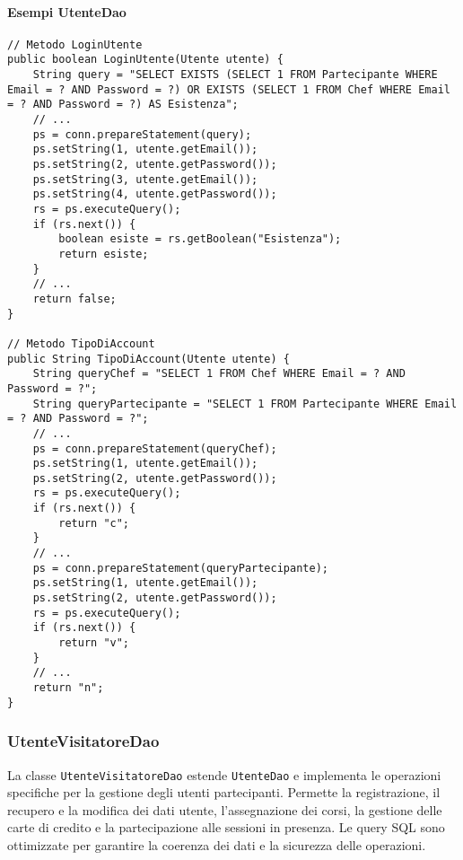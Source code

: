 \paragraph{Esempi UtenteDao}
\begin{verbatim}
// Metodo LoginUtente
public boolean LoginUtente(Utente utente) {
    String query = "SELECT EXISTS (SELECT 1 FROM Partecipante WHERE Email = ? AND Password = ?) OR EXISTS (SELECT 1 FROM Chef WHERE Email = ? AND Password = ?) AS Esistenza";
    // ...
    ps = conn.prepareStatement(query);
    ps.setString(1, utente.getEmail());
    ps.setString(2, utente.getPassword());
    ps.setString(3, utente.getEmail());
    ps.setString(4, utente.getPassword());
    rs = ps.executeQuery();
    if (rs.next()) {
        boolean esiste = rs.getBoolean("Esistenza");
        return esiste;
    }
    // ...
    return false;
}

// Metodo TipoDiAccount
public String TipoDiAccount(Utente utente) {
    String queryChef = "SELECT 1 FROM Chef WHERE Email = ? AND Password = ?";
    String queryPartecipante = "SELECT 1 FROM Partecipante WHERE Email = ? AND Password = ?";
    // ...
    ps = conn.prepareStatement(queryChef);
    ps.setString(1, utente.getEmail());
    ps.setString(2, utente.getPassword());
    rs = ps.executeQuery();
    if (rs.next()) {
        return "c";
    }
    // ...
    ps = conn.prepareStatement(queryPartecipante);
    ps.setString(1, utente.getEmail());
    ps.setString(2, utente.getPassword());
    rs = ps.executeQuery();
    if (rs.next()) {
        return "v";
    }
    // ...
    return "n";
}
\end{verbatim}

\subsubsection{UtenteVisitatoreDao}
La classe \texttt{UtenteVisitatoreDao} estende \texttt{UtenteDao} e implementa le operazioni specifiche per la gestione degli utenti partecipanti. Permette la registrazione, il recupero e la modifica dei dati utente, l'assegnazione dei corsi, la gestione delle carte di credito e la partecipazione alle sessioni in presenza. Le query SQL sono ottimizzate per garantire la coerenza dei dati e la sicurezza delle operazioni.

